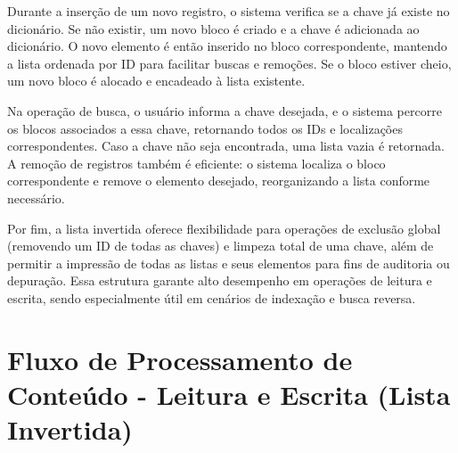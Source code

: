 \documentclass[12pt]{article}
\begin{document}
Durante a inserção de um novo registro, o sistema verifica se a chave já existe no dicionário. Se não existir, um novo bloco é criado e a chave é adicionada ao dicionário. O novo elemento é então inserido no bloco correspondente, mantendo a lista ordenada por ID para facilitar buscas e remoções. Se o bloco estiver cheio, um novo bloco é alocado e encadeado à lista existente.

Na operação de busca, o usuário informa a chave desejada, e o sistema percorre os blocos associados a essa chave, retornando todos os IDs e localizações correspondentes. Caso a chave não seja encontrada, uma lista vazia é retornada. A remoção de registros também é eficiente: o sistema localiza o bloco correspondente e remove o elemento desejado, reorganizando a lista conforme necessário.

Por fim, a lista invertida oferece flexibilidade para operações de exclusão global (removendo um ID de todas as chaves) e limpeza total de uma chave, além de permitir a impressão de todas as listas e seus elementos para fins de auditoria ou depuração. Essa estrutura garante alto desempenho em operações de leitura e escrita, sendo especialmente útil em cenários de indexação e busca reversa.

\section*{Fluxo de Processamento de Conteúdo - Leitura e Escrita (Lista Invertida)} 
\begin{center} 
\end{center}
\end{document}
